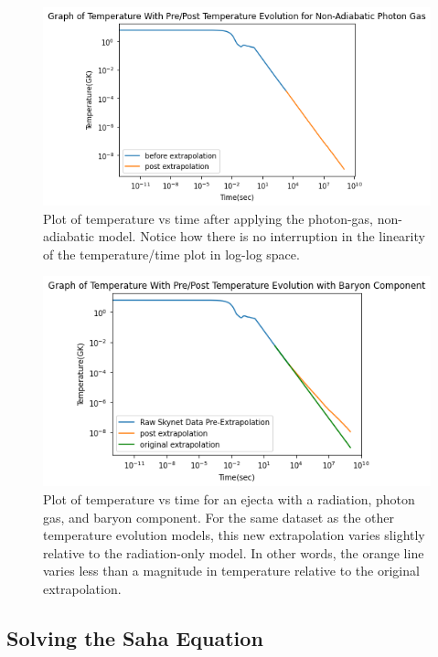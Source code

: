 \documentclass[11pt,a4paper]{article}
\begin{document}
\begin{figure}[h!]
  \includegraphics[scale = .6]{photon_only.png}
  \centering
  \caption{Plot of temperature vs time after applying the photon-gas, non-adiabatic model. Notice how there is no interruption in the linearity of the temperature/time plot in log-log space.}
\end{figure} 

\begin{figure}[H]
  \includegraphics[scale = .6]{photon_baryon.png}
  \centering
  \caption{Plot of temperature vs time for an ejecta with a radiation, photon gas, and baryon component. For the same dataset as the other temperature evolution models, this new extrapolation varies slightly relative to the radiation-only model. In other words, the orange line varies less than a magnitude in temperature relative to the original extrapolation. }
\end{figure} 

\subsection{Solving the Saha Equation}
\end{document}
